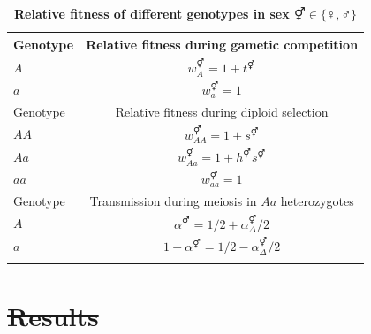 \documentclass[10pt,letterpaper]{article}
\providecommand{\DIFaddtex}[1]{{\protect\color{blue}\uwave{#1}}} %
\providecommand{\DIFdeltex}[1]{{\protect\color{red}\sout{#1}}}                      %
\providecommand{\DIFdelbegin}{} %
\providecommand{\DIFaddFL}[1]{\DIFadd{#1}} %
\providecommand{\DIFdelFL}[1]{\DIFdel{#1}} %
\providecommand{\DIFaddbeginFL}{} %
\providecommand{\DIFaddendFL}{} %
\providecommand{\DIFdelbeginFL}{} %
\providecommand{\DIFdelendFL}{} %
\providecommand{\DIFadd}[1]{\texorpdfstring{\DIFaddtex{#1}}{#1}} %
\providecommand{\DIFdel}[1]{\texorpdfstring{\DIFdeltex{#1}}{}} %
\newcommand{\DIFscaledelfig}{0.5}
\newlength{\DIFdelgraphicswidth} %
\newlength{\DIFdelgraphicsheight} %
\newcommand{\DIFaddincludegraphics}[2][]{{\color{blue}\fbox{\DIFOincludegraphics[#1]{#2}}}} %
\newcommand{\DIFdelincludegraphics}[2][]{%
\sbox{\DIFdelgraphicsbox}{\DIFOincludegraphics[#1]{#2}}%
\settoboxwidth{\DIFdelgraphicswidth}{\DIFdelgraphicsbox} %
\settoboxtotalheight{\DIFdelgraphicsheight}{\DIFdelgraphicsbox} %
\scalebox{\DIFscaledelfig}{%
\parbox[b]{\DIFdelgraphicswidth}{\usebox{\DIFdelgraphicsbox}\\[-\baselineskip] \rule{\DIFdelgraphicswidth}{0em}}\llap{\resizebox{\DIFdelgraphicswidth}{\DIFdelgraphicsheight}{%
\setlength{\unitlength}{\DIFdelgraphicswidth}%
\begin{picture}(1,1)%
\thicklines\linethickness{2pt} %
{\color[rgb]{1,0,0}\put(0,0){\framebox(1,1){}}}%
{\color[rgb]{1,0,0}\put(0,0){\line( 1,1){1}}}%
{\color[rgb]{1,0,0}\put(0,1){\line(1,-1){1}}}%
\end{picture}%
}\hspace*{3pt}}} %
} %
\DeclareRobustCommand{\DIFdelbegin}{\DIFOdelbegin \let\includegraphics\DIFdelincludegraphics} %
\DeclareRobustCommand{\DIFaddbeginFL}{\DIFOaddbeginFL \let\includegraphics\DIFaddincludegraphics} %
\DeclareRobustCommand{\DIFaddendFL}{\DIFOaddendFL \let\includegraphics\DIFOincludegraphics} %
\DeclareRobustCommand{\DIFdelbeginFL}{\DIFOdelbeginFL \let\includegraphics\DIFdelincludegraphics} %
\DeclareRobustCommand{\DIFdelendFL}{\DIFOaddendFL \let\includegraphics\DIFOincludegraphics} %
\begin{document}
\begin{table}[ht]
\smallskip
\caption{{\bf Relative fitness of different genotypes in sex \DIFdelbeginFL \DIFdelFL{$\Hermaphrodite \in \{\female,\male\}$ }\DIFdelendFL \DIFaddbeginFL \DIFaddFL{$\circ \in \{\female,\male\}$ }\DIFaddendFL } }
\begin{tabular}{l c }
\hline\hline
  Genotype & Relative fitness during gametic competition \\ [0.5ex] \hline
  $A$ & \DIFdelbeginFL \DIFdelFL{$w_{A}^\Hermaphrodite = 1+t^\Hermaphrodite$ }\DIFdelendFL \DIFaddbeginFL \DIFaddFL{$w_{A}^\circ = 1+t^\circ$ }\DIFaddendFL \\
  $a$ & \DIFdelbeginFL \DIFdelFL{$w_{a}^\Hermaphrodite = 1$ }\DIFdelendFL \DIFaddbeginFL \DIFaddFL{$w_{a}^\circ = 1$ }\DIFaddendFL \\ [0.5ex] \hline
  Genotype & Relative fitness during diploid selection \\ [0.5ex] \hline
  $AA$ & \DIFdelbeginFL \DIFdelFL{$w_{AA}^\Hermaphrodite = 1+ s^\Hermaphrodite$ }\DIFdelendFL \DIFaddbeginFL \DIFaddFL{$w_{AA}^\circ = 1+ s^\circ$ }\DIFaddendFL \\
  $Aa$ & \DIFdelbeginFL \DIFdelFL{$w_{Aa}^\Hermaphrodite = 1+h^\Hermaphrodite s^\Hermaphrodite$ }\DIFdelendFL \DIFaddbeginFL \DIFaddFL{$w_{Aa}^\circ = 1+h^\circ s^\circ$ }\DIFaddendFL \\
  $aa$ & \DIFdelbeginFL \DIFdelFL{$w_{aa}^\Hermaphrodite = 1$ }\DIFdelendFL \DIFaddbeginFL \DIFaddFL{$w_{aa}^\circ = 1$ }\DIFaddendFL \\ [0.5ex] \hline
  Genotype & Transmission during meiosis in $Aa$ heterozygotes \\ [0.5ex] \hline
  $A$ & \DIFdelbeginFL \DIFdelFL{$\alpha^\Hermaphrodite=1/2+\alpha_{\Delta}^{\Hermaphrodite}/2$ }\DIFdelendFL \DIFaddbeginFL \DIFaddFL{$\alpha^\circ=1/2+\alpha_{\Delta}^{\circ}/2$ }\DIFaddendFL \\
  $a$ & \DIFdelbeginFL \DIFdelFL{$1-\alpha^\Hermaphrodite=1/2-\alpha_{\Delta}^{\Hermaphrodite}/2$ }\DIFdelendFL \DIFaddbeginFL \DIFaddFL{$1-\alpha^\circ=1/2-\alpha_{\Delta}^{\circ}/2$ }\DIFaddendFL \\
  \hline \hline
  \label{tab:fitnesstable}
 \end{tabular}
\end{table}

\DIFdelbegin \section*{\DIFdel{Results}}
\end{document}
